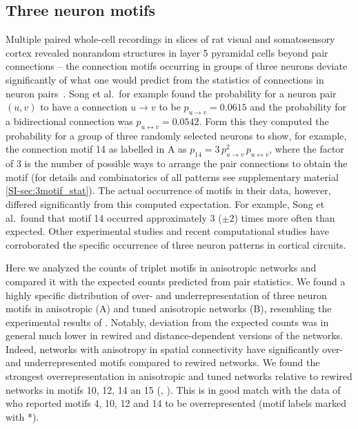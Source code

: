 \clearpage
\pagebreak
\newpage
\subsection*{Three neuron motifs}

Multiple paired whole-cell recordings in slices of rat visual and
somatosensory cortex revealed nonrandom structures in layer 5
pyramidal cells beyond pair connections -- the connection motifs
occurring in groups of three neurons deviate significantly of what one
would predict from the statistics of connections in neuron
pairs~\cite{Song2005, Perin2011}. Song et al.~for example found the
probability for a neuron pair $(u,v)$ to have a connection
$u \rightarrow v$ to be $p_{u \rightarrow v}= 0.0615$ and the
probability for a bidirectional connection was
$p_{u \leftrightarrow v} = 0.0542$. Form this they computed the
probability for a group of three randomly selected neurons to show,
for example, the connection motif 14 as labelled in
A as
$p_{14}= 3 \,p_{u \rightarrow v}^2 \, p_{u \leftrightarrow v}$, where
the factor of 3 is the number of possible ways to arrange the pair
connections to obtain the motif (for details and combinatorics of all
patterns see supplementary material \ref{SI-sec:3motif_stat}). The
actual occurrence of motifs in their data, however, differed
significantly from this computed expectation. For example, Song et
al.~found that motif 14 occurred approximately 3 ($\pm 2$) times more
often than expected. Other experimental studies \cite{Perin2011,
  Rieubland2014} and recent computational studies
\cite{Miner2016,Gal2017} have corroborated the specific occurrence of
three neuron patterns in cortical circuits.

Here we analyzed the counts of triplet motifs in anisotropic networks
and compared it with the expected counts predicted from pair
statistics. We found a highly specific distribution of over- and
underrepresentation of three neuron motifs in anisotropic
(A) and tuned anisotropic networks
(B), resembling the experimental results of
\textcite{Song2005}.%
%
%
%
Notably, deviation from the expected counts was in general much lower
in rewired and distance-dependent versions of the networks. Indeed,
networks with anisotropy in spatial connectivity have significantly
over- and underrepresented motifs compared to rewired networks. We
found the strongest overrepresentation in anisotropic and tuned
networks relative to rewired networks in motifs 10, 12, 14 an 15
(, ). This is in good
match with the data of \textcite{Perin2011} who reported motifs 4, 10,
12 and 14 to be overrepresented (motif labels marked with *).

